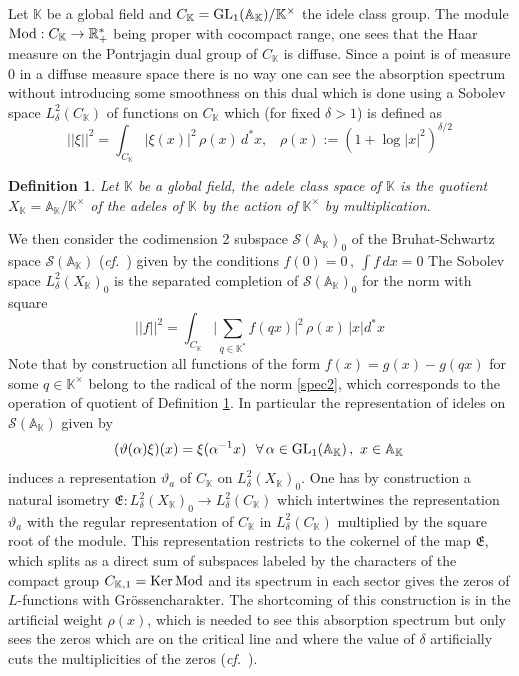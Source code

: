 \documentclass[12pt]{article}
\newtheorem{defn}[thm]{Definition}
\def\GL{{\rm GL}}
\def\Ker{{\rm Ker}}
\def\mmod{{\rm Mod}}
\def\A{{\mathbb A}}
\def\K{{\mathbb K}}
\def\R{{\mathbb R}}
\def\urep{\vartheta}
\def\mapE{{\mathfrak E}}
\def\cS{{\mathcal S}}
\newcommand{\cf}{{\it cf.}}
\begin{document}
Let $\K$ be a global field and $C_\K=\GL_1(\A_\K)/\K^\times$ the idele class group. The module $\mmod:C_\K\to \R_+^*$ being proper with cocompact range, one sees that the Haar measure on the Pontrjagin dual group of $C_\K$ is diffuse. Since a point is of measure $0$ in a diffuse measure space there is no way one can see the absorption spectrum without introducing some smoothness on this dual which is done using a Sobolev space $L_{\delta  }^2 ( C_\K )$ of functions on $C_\K$ which (for fixed $\delta>1$) is defined as
\begin{equation}
||\xi||^2=\int_{C_\K} \vert \xi (x) \vert^2 \, \rho(x) \, d^* x, \  \,  \ \ \rho(x):=(1 + \log \vert x
\vert^2)^{\delta   / 2} \label{sobolevck}
\end{equation}
\begin{defn}\label{adclassspace}
 Let $\K$ be a global field, the adele class space of $\K$ is the quotient $X_\K=\A_\K/\K^\times$ of the adeles of $\K$ by the action of $\K^\times$ by multiplication. 
\end{defn}
We then  
consider the codimension 2 subspace $\cS
(\A_\K)_0$ of the Bruhat-Schwartz space
$\cS (\A_\K)$ (\cf~\cite{Bruhat}) given by the conditions
$
f(0) = 0 \, , \ \int f \, dx = 0 
$
The Sobolev space $L_{\delta  }^2 (X_\K)_0$ is the separated completion of $\cS
(\A_\K)_0$ for the norm with square 
\begin{equation}
||f||^2=\int_{C_\K} \vert \sum_{q\in \K^*}  f (qx) \vert^2 \, \rho(x) \, \vert x\vert d^* x \label{spec2}
\end{equation}
Note that by construction all functions of the form $f(x)=g(x)-g(qx)$ for some $q\in \K^\times$ belong to the radical of the norm \eqref{spec2}, which corresponds to the operation of quotient of Definition \ref{adclassspace}. In particular  the representation of ideles on $\cS (\A_\K)$
given by 
\begin{equation}
(\urep (\alpha) \xi) (x) = \xi (\alpha^{-1} x)  \  \   \forall \,
\alpha \in \GL_1(\A_\K) \, , \ x \in \A_\K \,  \label{spec(3)}
\end{equation}
induces a representation $\urep_a$ of $C_\K$ on $L_{\delta  }^2 (X_\K)_0$. 
One has by construction a natural isometry $\mapE:L_{\delta  }^2 (X_\K)_0\to L_{\delta  }^2 ( C_\K )$ which intertwines the representation $\urep_a$ with the regular representation of $C_\K$ in $L_{\delta  }^2 ( C_\K )$ multiplied by the square root of the module.  This representation restricts to the cokernel of the map $\mapE$, which splits as a direct sum of subspaces labeled by the characters  of the compact group $C_{\K,1}=\Ker\, \mmod$ and its spectrum in each sector gives the  zeros of $L$-functions with Gr\"ossencharakter. The shortcoming of this construction is in the artificial weight $\rho(x)$, which is needed to see this absorption spectrum  but  only sees the zeros which are on the critical line and where the value of $\delta$ artificially cuts the multiplicities of the zeros (\cf~\cite{Co-zeta}). 
 
\end{document}
